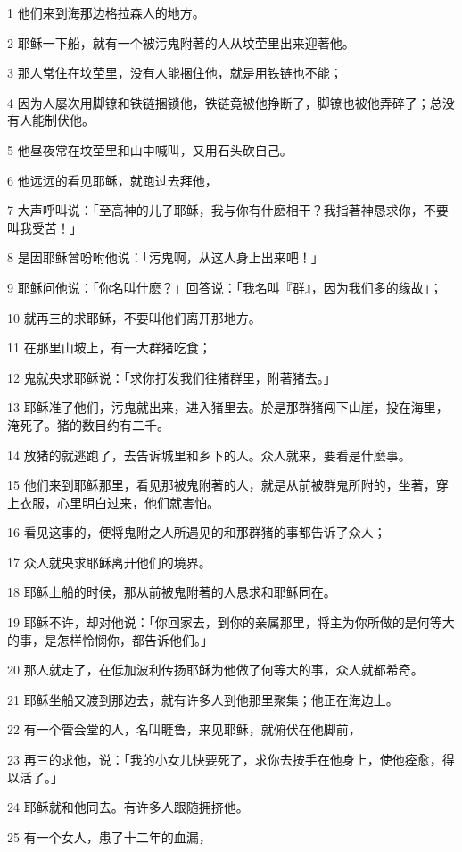 \par 1 他们来到海那边格拉森人的地方。
\par 2 耶稣一下船，就有一个被污鬼附著的人从坟茔里出来迎著他。
\par 3 那人常住在坟茔里，没有人能捆住他，就是用铁链也不能；
\par 4 因为人屡次用脚镣和铁链捆锁他，铁链竟被他挣断了，脚镣也被他弄碎了；总没有人能制伏他。
\par 5 他昼夜常在坟茔里和山中喊叫，又用石头砍自己。
\par 6 他远远的看见耶稣，就跑过去拜他，
\par 7 大声呼叫说：「至高神的儿子耶稣，我与你有什麽相干？我指著神恳求你，不要叫我受苦！」
\par 8 是因耶稣曾吩咐他说：「污鬼啊，从这人身上出来吧！」
\par 9 耶稣问他说：「你名叫什麽？」回答说：「我名叫『群』，因为我们多的缘故」；
\par 10 就再三的求耶稣，不要叫他们离开那地方。
\par 11 在那里山坡上，有一大群猪吃食；
\par 12 鬼就央求耶稣说：「求你打发我们往猪群里，附著猪去。」
\par 13 耶稣准了他们，污鬼就出来，进入猪里去。於是那群猪闯下山崖，投在海里，淹死了。猪的数目约有二千。
\par 14 放猪的就逃跑了，去告诉城里和乡下的人。众人就来，要看是什麽事。
\par 15 他们来到耶稣那里，看见那被鬼附著的人，就是从前被群鬼所附的，坐著，穿上衣服，心里明白过来，他们就害怕。
\par 16 看见这事的，便将鬼附之人所遇见的和那群猪的事都告诉了众人；
\par 17 众人就央求耶稣离开他们的境界。
\par 18 耶稣上船的时候，那从前被鬼附著的人恳求和耶稣同在。
\par 19 耶稣不许，却对他说：「你回家去，到你的亲属那里，将主为你所做的是何等大的事，是怎样怜悯你，都告诉他们。」
\par 20 那人就走了，在低加波利传扬耶稣为他做了何等大的事，众人就都希奇。
\par 21 耶稣坐船又渡到那边去，就有许多人到他那里聚集；他正在海边上。
\par 22 有一个管会堂的人，名叫睚鲁，来见耶稣，就俯伏在他脚前，
\par 23 再三的求他，说：「我的小女儿快要死了，求你去按手在他身上，使他痊愈，得以活了。」
\par 24 耶稣就和他同去。有许多人跟随拥挤他。
\par 25 有一个女人，患了十二年的血漏，
